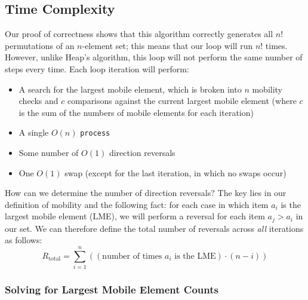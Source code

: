 \documentclass[10pt, oneside]{article}   	%
\begin{document}
\subsection{Time Complexity}

Our proof of correctness shows that this algorithm correctly generates all $n!$ permutations of an $n$-element set; this means that our loop will run $n!$ times. However, unlike Heap's algorithm, this loop will not perform the same number of steps every time. Each loop iteration will perform:
\begin{itemize}
	\item A search for the largest mobile element, which is broken into $n$ mobility checks and $c$ comparisons against the current largest mobile element (where $c$ is the sum of the numbers of mobile elements for each iteration)
	\item A single $O(n)$ \texttt{process}
	\item Some number of $O(1)$ direction reversals
	\item One $O(1)$ swap (except for the last iteration, in which no swaps occur)
\end{itemize}
How can we determine the number of direction reversals? The key lies in our definition of mobility and the following fact: for each case in which item $a_{i}$ is the largest mobile element (LME), we will perform a reversal for each item $a_{j} > a_{i}$ in our set. We can therefore define the total number of reversals across \emph{all} iterations as follows:
\[
	R_{\text{total}} = \sum_{i = 1}^{n} \left( (\text{number of times $a_{i}$ is the LME}) \cdot (n - i) \right)
\]

\subsubsection{Solving for Largest Mobile Element Counts}
\end{document}
